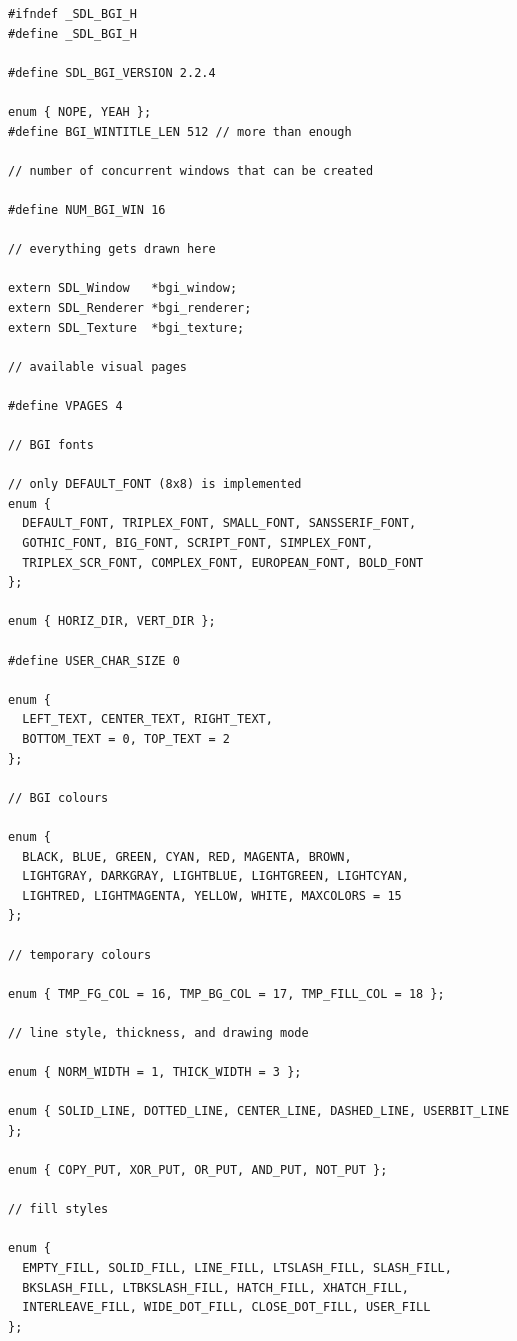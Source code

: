 \documentclass[a4paper,11pt]{article}
\begin{document}
\begin{small}
\begin{spacing}{0.85}
\begin{verbatim}
#ifndef _SDL_BGI_H
#define _SDL_BGI_H

#define SDL_BGI_VERSION 2.2.4

enum { NOPE, YEAH };
#define BGI_WINTITLE_LEN 512 // more than enough

// number of concurrent windows that can be created

#define NUM_BGI_WIN 16

// everything gets drawn here

extern SDL_Window   *bgi_window;
extern SDL_Renderer *bgi_renderer;
extern SDL_Texture  *bgi_texture;

// available visual pages

#define VPAGES 4

// BGI fonts

// only DEFAULT_FONT (8x8) is implemented
enum {
  DEFAULT_FONT, TRIPLEX_FONT, SMALL_FONT, SANSSERIF_FONT,
  GOTHIC_FONT, BIG_FONT, SCRIPT_FONT, SIMPLEX_FONT,
  TRIPLEX_SCR_FONT, COMPLEX_FONT, EUROPEAN_FONT, BOLD_FONT
};

enum { HORIZ_DIR, VERT_DIR };

#define USER_CHAR_SIZE 0

enum {
  LEFT_TEXT, CENTER_TEXT, RIGHT_TEXT,
  BOTTOM_TEXT = 0, TOP_TEXT = 2
};

// BGI colours

enum {
  BLACK, BLUE, GREEN, CYAN, RED, MAGENTA, BROWN,
  LIGHTGRAY, DARKGRAY, LIGHTBLUE, LIGHTGREEN, LIGHTCYAN,
  LIGHTRED, LIGHTMAGENTA, YELLOW, WHITE, MAXCOLORS = 15
};

// temporary colours

enum { TMP_FG_COL = 16, TMP_BG_COL = 17, TMP_FILL_COL = 18 };

// line style, thickness, and drawing mode

enum { NORM_WIDTH = 1, THICK_WIDTH = 3 };

enum { SOLID_LINE, DOTTED_LINE, CENTER_LINE, DASHED_LINE, USERBIT_LINE };

enum { COPY_PUT, XOR_PUT, OR_PUT, AND_PUT, NOT_PUT };

// fill styles

enum {
  EMPTY_FILL, SOLID_FILL, LINE_FILL, LTSLASH_FILL, SLASH_FILL,
  BKSLASH_FILL, LTBKSLASH_FILL, HATCH_FILL, XHATCH_FILL,
  INTERLEAVE_FILL, WIDE_DOT_FILL, CLOSE_DOT_FILL, USER_FILL
};


\end{verbatim}
\end{spacing}
\end{small}
\end{document}
